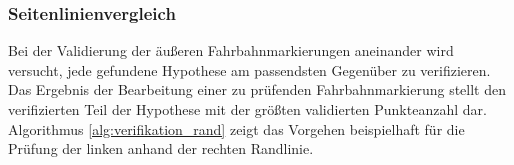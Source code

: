 \subsubsection{Seitenlinienvergleich \dcsecondauthorshort} 
\label{sssec:fahrspurerkennung:riverflow:verifikation:seitenlinienvergleich}

Bei der Validierung der äußeren Fahrbahnmarkierungen aneinander wird versucht, jede gefundene Hypothese am passendsten Gegenüber zu verifizieren. 
Das Ergebnis der Bearbeitung einer zu prüfenden Fahrbahnmarkierung stellt den verifizierten Teil der Hypothese mit der größten validierten Punkteanzahl dar.
Algorithmus \ref{alg:verifikation_rand} zeigt das Vorgehen beispielhaft für die Prüfung der linken anhand der rechten Randlinie. 


